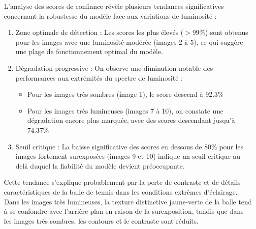 L'analyse des scores de confiance révèle plusieurs tendances significatives concernant la robustesse du modèle face aux variations de luminosité :

\begin{enumerate}
    \item Zone optimale de détection : Les scores les plus élevés ($>99\%$) sont obtenus pour les images avec une luminosité modérée (images 2 à 5), ce qui suggère une plage de fonctionnement optimal du modèle.
    \item Dégradation progressive : On observe une diminution notable des performances aux extrémités du spectre de luminosité :
    \begin{itemize}
        \item Pour les images très sombres (image 1), le score descend à 92.3\%
        \item Pour les images très lumineuses (images 7 à 10), on constate une dégradation encore plus marquée, avec des scores descendant jusqu'à 74.37\%
    \end{itemize}
    \item Seuil critique : La baisse significative des scores en dessous de 80\% pour les images fortement surexposées (images 9 et 10) indique un seuil critique au-delà duquel la fiabilité du modèle devient préoccupante.
\end{enumerate}

Cette tendance s'explique probablement par la perte de contraste et de détails caractéristiques de la balle de tennis dans les conditions extrêmes d'éclairage. Dans les images très lumineuses, la texture distinctive jaune-verte de la balle tend à se confondre avec l'arrière-plan en raison de la surexposition, tandis que dans les images très sombres, les contours et le contraste sont réduits.

